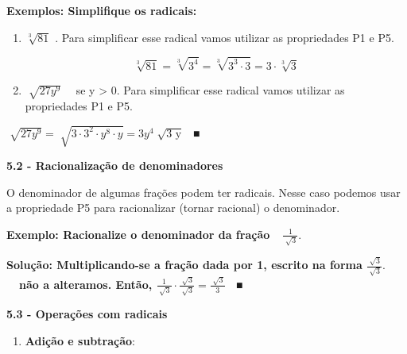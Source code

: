 \documentclass[12pt]{article}
\renewcommand{\_}{\kern-1.5pt\textunderscore\kern-1.5pt}
\begin{document}
\vspace{\baselineskip}
\textbf{Exemplos: Simplifique os radicais:}\par

\begin{enumerate}
	\item  \( \sqrt[3]{81} \)  . Para simplificar esse radical vamos utilizar as propriedades P1 e P5.\par

 \[ \sqrt[3]{81}=\sqrt[3]{3^{4}}=\sqrt[3]{3^{3} \cdot 3}=3 \cdot \sqrt[3]{3} \] \par

	\item  \( \sqrt[]{27y^{9}} \) \ \  se y > 0. Para simplificar esse radical vamos utilizar as propriedades P1 e P5.
\end{enumerate}\par

\tab  \( \sqrt[]{27y^{9}}=\sqrt[]{3  \cdot 3^{2} \cdot y^{8} \cdot y}=3y^{4}\sqrt[]{\text{3 y}} \) \  ■\tab \tab \par

\textbf{5.2 - Racionalização de denominadores}\par

O denominador de algumas frações podem ter radicais. Nesse caso podemos usar a propriedade P5 para racionalizar (tornar racional) o denominador. \par

\begin{adjustwidth}{0.5in}{0.0in}
\textbf{Exemplo: Racionalize o denominador da fração\ \    \( \frac{1}{\sqrt[]{3}}. \) }\par

\end{adjustwidth}

\begin{adjustwidth}{0.5in}{0.0in}
\textbf{Solução: Multiplicando-se a fração dada por 1, escrito na forma  \( \frac{\sqrt[]{3}}{\sqrt[]{3}}. \) \ \  não a alteramos. Então,  \( \frac{1}{\sqrt[]{3}} \cdot \frac{\sqrt[]{3}}{\sqrt[]{3}}=\frac{\sqrt[]{3}}{3} \) \  ■}\par

\end{adjustwidth}


\vspace{\baselineskip}
\textbf{5.3 - Operações com radicais}\par

\begin{enumerate}
	\item \textbf{Adição e subtração}:
\end{enumerate}\par
\end{document}
